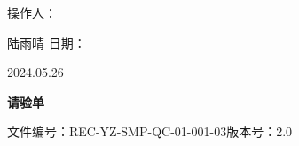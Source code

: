 \documentclass[UTF8,10pt,a4paper,fontset=fandol]{ctexart}
\newcommand{\fieldvalue}[1]{#1}
\newcommand{\handwritten}[1]{#1}
\begin{document}
\vfill

\noindent 操作人：

\fieldvalue{\handwritten{陆雨晴}}
\hfill
日期：

\fieldvalue{\handwritten{2024.05.26}}

\newpage

\begin{center}
\textbf{请验单}
\end{center}

\noindent
文件编号：REC-YZ-SMP-QC-01-001-03\qquad 版本号：2.0

\vspace{0.5em}
\end{document}
